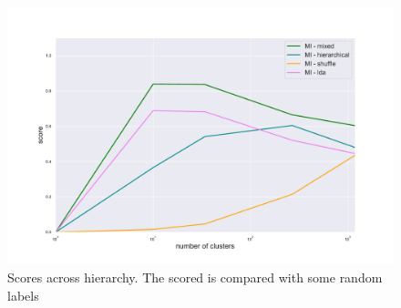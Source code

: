 \begin{figure}[htb!]
    \centering
    \includegraphics[width=0.9\linewidth]{pictures/topic/gtex/oversigma_10tissue/metric_scores_all.pdf}
    \caption{Scores across hierarchy. The scored is compared with some random labels}
    \label{fig:topic/gtex/oversigma_10tissue/metric_scores_all}
\end{figure}
